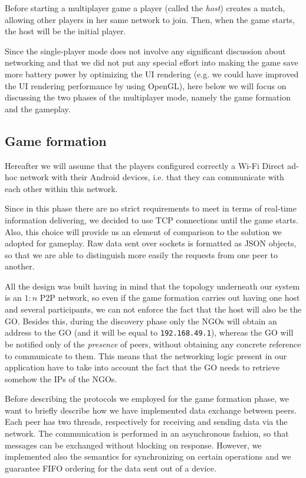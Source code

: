 Before starting a multiplayer game a player (called the \textit{host}) creates
a match, allowing other players in her same network to join. Then, when the
game starts, the host will be the initial player.

Since the single-player mode does not involve any significant discussion about
networking and that we did not put any special effort into making the game save
more battery power by optimizing the UI rendering (e.g. we could have improved
the UI rendering performance by using OpenGL), here below we will focus on
discussing the two phases of the multiplayer mode, namely the game formation
and the gameplay.

\subsection{Game formation}

Hereafter we will assume that the players configured correctly a Wi-Fi Direct
ad-hoc network with their Android devices, i.e. that they can communicate with
each other within this network.

Since in this phase there are no strict requirements to meet in terms of
real-time information delivering, we decided to use TCP connections until the
game starts. Also, this choice will provide us an element of comparison to the
solution we adopted for gameplay.
Raw data sent over sockets is formatted as JSON objects, so that we are able to
distinguish more easily the requests from one peer to another.

All the design was built having in mind that the topology underneath our system
is an $1:n$ P2P network, so even if the game formation carries out having one
host and several participants, we can not enforce the fact that the host will
also be the GO. Besides this, during the discovery phase only the NGOs will
obtain an address to the GO (and it will be equal to \texttt{192.168.49.1}),
whereas the GO will be notified only of the \textit{presence} of peers, without
obtaining any concrete reference to communicate to them. This means that the
networking logic present in our application have to take into account the fact
that the GO needs to retrieve somehow the IPs of the NGOs.

Before describing the protocols we employed for the game formation phase, we
want to briefly describe how we have implemented data exchange between peers.
Each peer has two threads, respectively for receiving and sending data via the
network. The communication is performed in an asynchronous fashion, so that
messages can be exchanged without blocking on response. However, we implemented
also the semantics for synchronizing on certain operations and we guarantee FIFO
ordering for the data sent out of a device.

